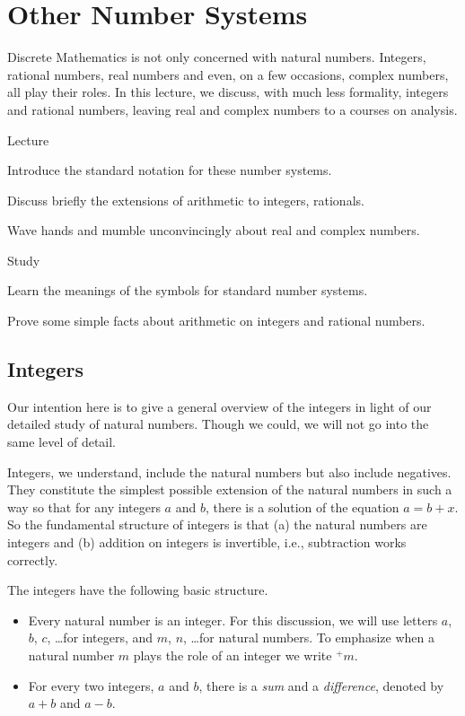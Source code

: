 \chapter{Other Number Systems}

Discrete Mathematics is not only concerned with natural numbers. Integers, rational numbers, real numbers and even, on a few occasions, complex numbers, all play their roles. In this lecture, we discuss, with much less formality, integers and rational numbers, leaving real and complex numbers to a courses on analysis.

\begin{goals}
\begin{goal}{Lecture}
\item Introduce the standard notation for these number systems.
\item Discuss briefly the extensions of arithmetic to integers, rationals.
\item Wave hands and mumble unconvincingly about real and complex numbers.
\end{goal}

\begin{goal}{Study}
\item Learn the meanings of the symbols for standard number systems.
\item Prove some simple facts about arithmetic on integers and rational numbers.
\end{goal}
\end{goals}

\section{Integers}

Our intention here is to give a general overview of the integers in light of our detailed study of natural numbers.
Though we could, we will not go into the same level of detail.

Integers, we understand, include the natural numbers but also include negatives. They constitute the simplest possible extension of the natural numbers in such a way so that for any integers $a$ and $b$, there is a solution of the equation $a = b + x$.  
So the fundamental structure of integers is that (a) the natural numbers are integers and (b) addition on integers is invertible, i.e., subtraction works correctly.

\begin{postulate}\label{post:IntSignature}
The integers have the following basic structure.

\begin{itemize}
\item Every natural number is an integer. For this discussion, we will use letters $a$, $b$, $c$, \ldots for integers,
and $m$, $n$, \ldots for natural numbers.
To emphasize when a natural number $m$ plays the role of an integer we write ${}^+m$.
\item For every two integers, $a$ and $b$, there is a \emph{sum} and a \emph{difference}, denoted by $a+b$ and $a-b$. 
\end{itemize}
\end{postulate}

